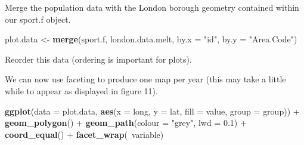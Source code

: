 \documentclass[]{article}
\newenvironment{Shaded}{}{}
\newcommand{\KeywordTok}[1]{\textcolor[rgb]{0.00,0.44,0.13}{\textbf{{#1}}}}
\newcommand{\DataTypeTok}[1]{\textcolor[rgb]{0.56,0.13,0.00}{{#1}}}
\newcommand{\FloatTok}[1]{\textcolor[rgb]{0.25,0.63,0.44}{{#1}}}
\newcommand{\StringTok}[1]{\textcolor[rgb]{0.25,0.44,0.63}{{#1}}}
\newcommand{\NormalTok}[1]{{#1}}
\begin{document}
Merge the population data with the London borough geometry contained
within our sport.f object.

\begin{Shaded}
\begin{Highlighting}[]
\NormalTok{plot.data <-}\StringTok{ }\KeywordTok{merge}\NormalTok{(sport.f, london.data.melt, }\DataTypeTok{by.x =} \StringTok{"id"}\NormalTok{, }\DataTypeTok{by.y =} \StringTok{"Area.Code"}\NormalTok{)}
\end{Highlighting}
\end{Shaded}

Reorder this data (ordering is important for plots).

\begin{Shaded}
\end{Shaded}

We can now use faceting to produce one map per year (this may take a
little while to appear as displayed in figure 11).

\begin{Shaded}
\begin{Highlighting}[]
\KeywordTok{ggplot}\NormalTok{(}\DataTypeTok{data =} \NormalTok{plot.data, }\KeywordTok{aes}\NormalTok{(}\DataTypeTok{x =} \NormalTok{long, }\DataTypeTok{y =} \NormalTok{lat, }\DataTypeTok{fill =} \NormalTok{value, }\DataTypeTok{group =} \NormalTok{group)) +}\StringTok{ }
\StringTok{    }\KeywordTok{geom_polygon}\NormalTok{() +}\StringTok{ }\KeywordTok{geom_path}\NormalTok{(}\DataTypeTok{colour =} \StringTok{"grey"}\NormalTok{, }\DataTypeTok{lwd =} \FloatTok{0.1}\NormalTok{) +}\StringTok{ }\KeywordTok{coord_equal}\NormalTok{() +}\StringTok{ }
\StringTok{    }\KeywordTok{facet_wrap}\NormalTok{(~variable)}
\end{Highlighting}
\end{Shaded}
\end{document}
